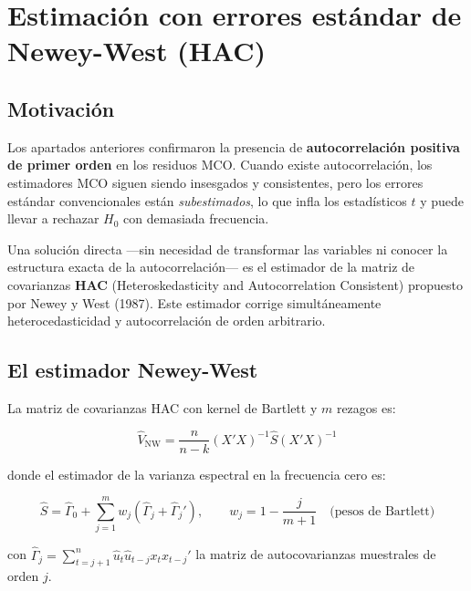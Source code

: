 \documentclass[12pt,a4paper]{article}
\begin{document}
\section{Estimación con errores estándar de Newey-West (HAC)}
\label{sec:F}

\subsection{Motivación}

Los apartados anteriores confirmaron la presencia de \textbf{autocorrelación
positiva de primer orden} en los residuos MCO. Cuando existe autocorrelación,
los estimadores MCO siguen siendo insesgados y consistentes, pero los errores
estándar convencionales están \emph{subestimados}, lo que infla los estadísticos
$t$ y puede llevar a rechazar $H_0$ con demasiada frecuencia.

Una solución directa ---sin necesidad de transformar las variables ni conocer
la estructura exacta de la autocorrelación--- es el estimador de la matriz
de covarianzas \textbf{HAC} (Heteroskedasticity and Autocorrelation Consistent)
propuesto por Newey y West (1987). Este estimador corrige simultáneamente
heterocedasticidad y autocorrelación de orden arbitrario.

\subsection{El estimador Newey-West}

La matriz de covarianzas HAC con kernel de Bartlett y $m$ rezagos es:

\begin{equation}
  \hat{V}_{\text{NW}} = \frac{n}{n-k}(X'X)^{-1}\hat{S}(X'X)^{-1}
  \label{eq:vnw}
\end{equation}

\noindent donde el estimador de la varianza espectral en la frecuencia cero es:

\begin{equation}
  \hat{S} = \hat{\Gamma}_0 + \sum_{j=1}^{m} w_j \left(\hat{\Gamma}_j + \hat{\Gamma}_j'\right),
  \qquad
  w_j = 1 - \frac{j}{m+1} \quad\text{(pesos de Bartlett)}
  \label{eq:snw}
\end{equation}

\noindent con $\hat{\Gamma}_j = \sum_{t=j+1}^{n} \hat{u}_t \hat{u}_{t-j} x_t x_{t-j}'$
la matriz de autocovarianzas muestrales de orden $j$.
\end{document}
